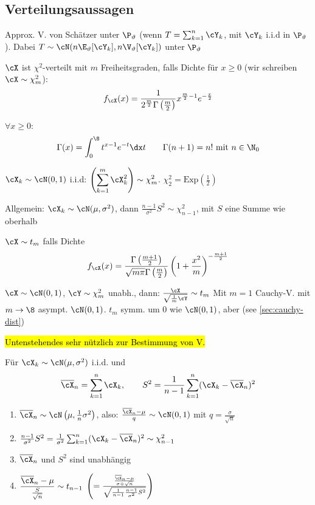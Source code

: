 \subsection{Verteilungsaussagen}
\label{sec:estimators-properties}
Approx. V. von Schätzer unter $\P_\vartheta$ (wenn $T = \sum_{k = 1}^{n} \cY_k$, mit $\cY_k$ i.i.d in $\P_\vartheta$).
Dabei $T \sim \cN(n \E_\vartheta[\cY_k], n \V_\vartheta[\cY_k])$ unter $\P_\vartheta$

 $\cX$ ist $\chi^2$-verteilt mit $m$ Freiheitsgraden, falls Dichte für $x \geq 0$ (wir schreiben $\cX \sim \chi^2_m$):
\[
    f_\cX(x) = \frac{1}{2^{\frac{m}{2}} \Gamma\left(\frac{m}{2}\right)} x^{\frac{m}{2} - 1} e^{-\frac{x}{2}}
\]

 $\forall x \geq 0$:
\[
    \Gamma(x) = \int_{0}^{\8} t^{x - 1} e^{-t} \dx t \qquad \Gamma(n + 1) = n! \text{ mit } n \in \N_0
\]

\shortremark $\cX_k \sim \cN(0, 1)$ i.i.d: $\displaystyle \left( \sum_{k = 1}^{m} \cX_k^2 \right) \sim \chi^2_m$.
$\chi^2_2 = \text{Exp}(\frac{1}{2})$

\shortremark Allgemein: $\cX_k \sim \cN(\mu, \sigma^2)$, dann $\frac{n - 1}{\sigma^2} S^2 \sim \chi_{n - 1}^2$, mit $S$ eine Summe wie oberhalb

 $\cX \sim t_m$ falls Dichte
\[
    f_\cX(x) = \frac{\Gamma\left( \frac{m + 1}{2} \right)}{\sqrt{m \pi} \Gamma \left( \frac{m}{2} \right)} \left( 1 + \frac{x^2}{m} \right)^{-\frac{m + 1}{2}}
\]

\shortremark $\cX \sim \cN(0, 1)$, $\cY \sim \chi^2_m$ unabh., dann: $\frac{\cX}{\sqrt{\frac{1}{m} \cY}} \sim t_m$
Mit $m = 1$ Cauchy-V. mit $m \rightarrow \8$ asympt. $\cN(0, 1)$. $t_m$ symm. um $0$ wie $\cN(0, 1)$, aber  (see \ref{sec:cauchy-dist})

\hl{Untenstehendes sehr nützlich zur Bestimmung von V.}

\shorttheorem Für $\cX_k \sim \cN(\mu, \sigma^2)$ i.i.d. und
\[
    \overline{\cX}_n = \sum_{k = 1}^{n} \cX_k, \qquad S^2 = \frac{1}{n - 1} \sum_{k = 1}^{n} (\cX_k - \overline{\cX}_n)^2
\]
\begin{enumerate}
    \item $\overline{\cX}_n \sim \cN\left( \mu, \frac{1}{n} \sigma^2 \right)$, also: $\frac{\overline{\cX}_n - \mu}{q} \sim \cN(0, 1)$ mit $q = \frac{\sigma}{\sqrt{n}}$
    \item $\frac{n - 1}{\sigma^2} S^2 = \frac{1}{\sigma^2} \sum_{k = 1}^{n} (\cX_k - \overline{\cX}_n)^2 \sim \chi^2_{n - 1}$
    \item $\overline{\cX}_n$ und $S^2$ sind unabhängig
    \item $\displaystyle \frac{\overline{\cX}_n - \mu}{\frac{S}{\sqrt{n}}}
              \sim t_{n - 1}$
          $\left( = \frac{\frac{\overline{\cX}_n - \mu}{\sigma \div \sqrt{n}}}{\sqrt{\frac{1}{n - 1} \frac{n - 1}{\sigma^2} S^2}} \right)$
\end{enumerate}
